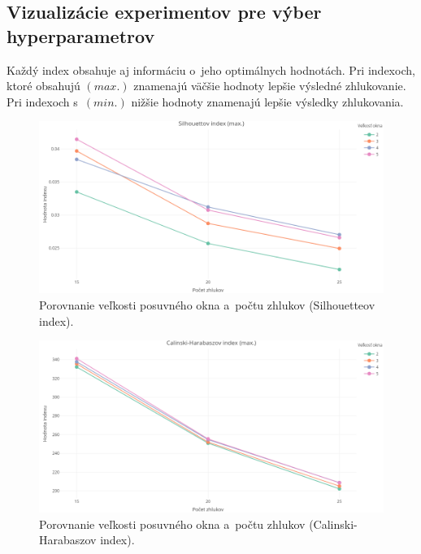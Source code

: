 \documentclass[a4paper,twoside,slovak,12pt,appendix]{article}
\begin{document}
\begin{appendices}

\newpage
\section{Vizualizácie experimentov pre výber hyperparametrov}
\label{c:clustering-hyperparameters-experiments}
Každý index obsahuje aj informáciu o~jeho optimálnych hodnotách. Pri indexoch,
ktoré obsahujú $(max.)$ znamenajú väčšie hodnoty lepšie výsledné zhlukovanie.
Pri indexoch s~$(min.)$ nižšie hodnoty znamenajú lepšie výsledky zhlukovania.

\begin{figure}[htbp]
  \centering
  \includegraphics[width=\textwidth]{cvi/dtw_basic_workdays_sparse/201902271850-Sil-dtw_basic_workdays_sparse.png}
  \caption{Porovnanie veľkosti posuvného okna a~počtu zhlukov (Silhouetteov index).}
\end{figure}
\begin{figure}[htbp]
  \centering
  \includegraphics[width=\textwidth]{cvi/dtw_basic_workdays_sparse/201902271850-CH-dtw_basic_workdays_sparse.png}
  \caption{Porovnanie veľkosti posuvného okna a~počtu zhlukov (Calinski-Harabaszov index).}

\end{figure}
\end{appendices}
\end{document}
